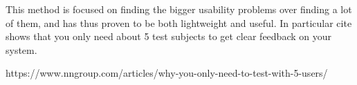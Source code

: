This method is focused on finding the bigger usability problems over finding a lot of them, and has thus proven to be both lightweight and useful. In particular cite shows that you only need about 5 test subjects to get clear feedback on your system. 

https://www.nngroup.com/articles/why-you-only-need-to-test-with-5-users/